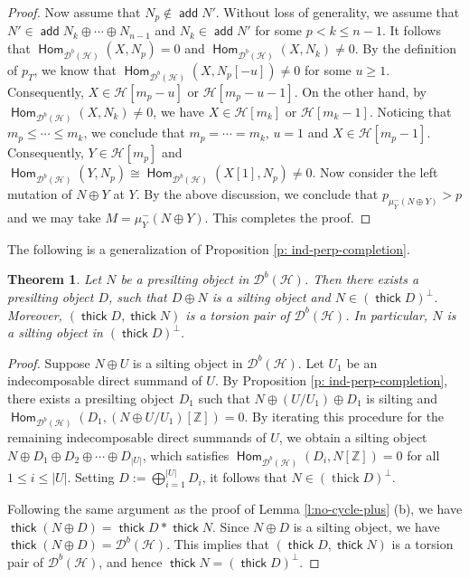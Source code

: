 \documentclass[12pt,a4paper,reqno]{amsart}
\newtheorem{theorem}{Theorem}[section]
\theoremstyle{definition}
\newcommand{\opname}[1]{\operatorname{\mathsf{#1}}}
\newcommand{\add}{\opname{add}\nolimits}
\newcommand{\der}{\cd}
\newcommand{\thick}{\opname{thick}}
\newcommand{\Hom}{\opname{Hom}}
\newcommand{\cd}{{\mathcal D}}
\begin{document}
\begin{proof}
Now assume that $N_p\not\in \add N'$. Without loss of generality, we assume that $N'\in \add N_k\oplus\cdots\oplus N_{n-1}$ and $N_k\in \add N'$ for some $p<k\leq n-1$. It follows that $\Hom_{\der^b(\mathcal{H})}(X,N_p)=0$ and $\Hom_{\der^b(\mathcal{H})}(X,N_k)\neq 0$.  By the definition of $p_T$, we know that $\Hom_{\der^b(\mathcal{H})}(X,N_p[-u])\neq 0$ for some $u\geq 1$. Consequently, $X\in \mathcal{H}[m_p-u]$ or $\mathcal{H}[m_p-u-1]$. On the other hand, by $\Hom_{\der^b(\mathcal{H})}(X,N_k)\neq 0$, we have $X\in \mathcal{H}[m_k]$ or $\mathcal{H}[m_k-1]$. Noticing that $m_p\leq \cdots\leq m_k$, we conclude that $m_p=\cdots=m_k$, $u=1$ and $X\in \mathcal{H}[m_p-1]$. Consequently, $Y\in \mathcal{H}[m_p]$ and $\Hom_{\der^b(\mathcal{H})}(Y,N_p)\cong \Hom_{\der^b(\mathcal{H})}(X[1],N_p)\neq 0$. Now consider the left mutation  of $N\oplus Y$ at $Y$. By the above discussion, we conclude that $p_{\mu_Y^-(N\oplus Y)}>p$ and we may take $M=\mu_Y^-(N\oplus Y)$. This completes the proof.
\end{proof}

The following is a generalization of Proposition \ref{p: ind-perp-completion}.
\begin{theorem}\label{t: perp-completion}
Let $N$ be a presilting object in $\der^b(\mathcal{H})$. Then there exists a presilting object $D$, such that $D \oplus N$ is a silting object and $N \in (\thick D)^\perp$. Moreover, $(\thick D, \thick N)$ is a torsion pair of $\der^b(\mathcal{H})$. In particular, $N$ is a silting object in $(\thick D)^\perp$.
\end{theorem}
\begin{proof}
Suppose $N \oplus U$ is a silting object in $\der^b(\mathcal{H})$. Let $U_1$ be an indecomposable direct summand of $U$. By Proposition \ref{p: ind-perp-completion}, there exists a presilting object $D_1$ such that $N \oplus (U/U_1) \oplus D_1$ is silting and $\Hom_{\der^b(\mathcal{H})}(D_1, (N \oplus U/U_1)[\mathbb{Z}]) = 0$. By iterating this procedure for the remaining indecomposable direct summands of $U$, we obtain a silting object $N \oplus D_1 \oplus D_2 \oplus \cdots \oplus D_{|U|}$, which satisfies $\Hom_{\der^b(\mathcal{H})}(D_i, N[\mathbb{Z}]) = 0$ for all $1 \leq i \leq |U|$. Setting $D := \bigoplus_{i=1}^{|U|} D_i$, it follows that $N \in (\operatorname{thick} D)^\perp$.


Following the same argument as the proof of Lemma \ref{l:no-cycle-plus} (b), we have $\thick (N \oplus D) = \thick D * \thick N $. Since $N \oplus D$ is a silting object, we have $\thick (N \oplus D) = \der^b(\mathcal{H})$. This implies that $(\thick D, \thick N)$ is a torsion pair of $\der^b(\mathcal{H})$, and hence $\thick N = (\thick D)^\perp$.
\end{proof}
\end{document}
